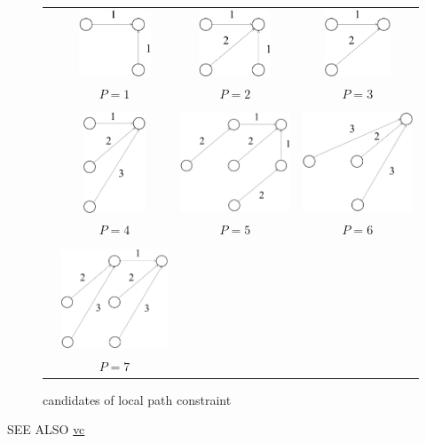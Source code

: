 \begin{figure}[htbp]
 \begin{center}
  \begin{tabular}{cccc} \\[-1ex]
   &\includegraphics[height=2cm]{fig/path1.eps}
   &\includegraphics[height=2cm]{fig/path2.eps}
   &\includegraphics[height=2cm]{fig/path3.eps}\\
   &$P=1$&$P=2$&$P=3$\\
   &&&\\
   &\includegraphics[height=3cm]{fig/path4.eps}
       &\includegraphics[height=3cm]{fig/path5.eps}
   &\includegraphics[height=3cm]{fig/path6.eps}\\
   &$P=4$&$P=5$&$P=6$\\
   &&&\\
   &\includegraphics[height=3cm]{fig/path7.eps}
       &&\\
   &$P=7$&&\\
  \end{tabular}
 \end{center}
 \caption{candidates of local path constraint}
 \label{fig:dtw_cand}
\end{figure}

\begin{qsection}{SEE ALSO}
\hyperlink{vc}{vc}
\end{qsection}

